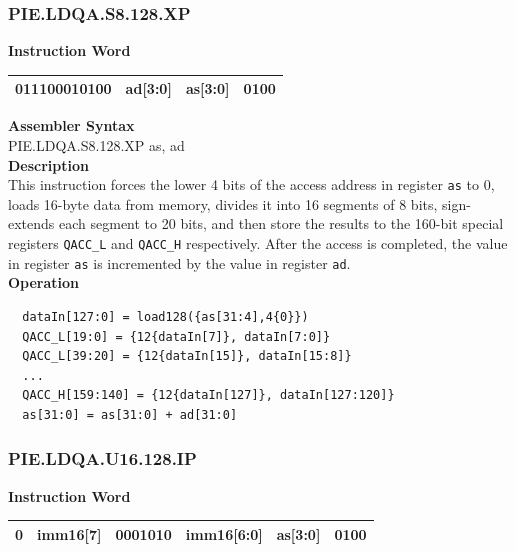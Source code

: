 \newpage
\subsubsection{PIE.LDQA.S8.128.XP}\label{instruction:PIELDQAS8128XP}
\setlength\tabcolsep{6pt}
\textbf{Instruction Word} \\
\begin{tabular}{|c|c|c|c|}
	\hline
	011100010100 & ad[3:0] & as[3:0] & 0100 \\
	\hline
\end{tabular}

\textbf{Assembler Syntax} \\
PIE.LDQA.S8.128.XP as, ad \\
\textbf{Description} \\
This instruction forces the lower 4 bits of the access address in register \lstinline{as} to 0, loads 16-byte data from memory, divides it into 16 segments of 8 bits, sign-extends each segment to 20 bits, and then store the results to the 160-bit special registers \lstinline{QACC_L} and \lstinline{QACC_H} respectively. After the access is completed, the value in register \lstinline{as} is incremented by the value in register \lstinline{ad}.\\
\textbf{Operation}
\begin{lstlisting}
  dataIn[127:0] = load128({as[31:4],4{0}})
  QACC_L[19:0] = {12{dataIn[7]}, dataIn[7:0]}
  QACC_L[39:20] = {12{dataIn[15]}, dataIn[15:8]}
  ...
  QACC_H[159:140] = {12{dataIn[127]}, dataIn[127:120]}
  as[31:0] = as[31:0] + ad[31:0]
\end{lstlisting}

\newpage
\subsubsection{PIE.LDQA.U16.128.IP}\label{instruction:PIELDQAU16128IP}
\setlength\tabcolsep{6pt}
\textbf{Instruction Word} \\
\begin{tabular}{|c|c|c|c|c|c|}
	\hline
	0 & imm16[7] & 0001010 & imm16[6:0] & as[3:0] & 0100 \\
	\hline
\end{tabular}

